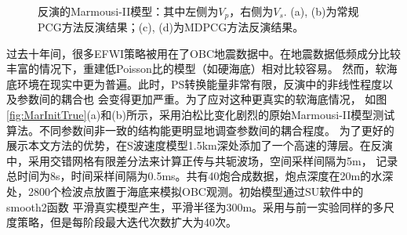 \begin{figure}[!htb]
    \begin{center}
		\\
        \caption{
			反演的Marmousi-II模型：其中左侧为$V_p$，右侧为$V_s$. (a), (b)为常规PCG方法反演结果；(c), (d)为MDPCG方法反演结果。
    }
    \label{fig:MarInvert}
    \end{center}
\end{figure}
过去十年间，很多EFWI策略被用在了OBC地震数据中。在地震数据低频成分比较丰富的情况下，重建低Poisson比的模型（如硬海底）相对比较容易\cite[]{bae:2012}。
然而，软海底环境在现实中更为普遍。此时，PS转换能量非常有限，反演中的非线性程度以及参数间的耦合也
会变得更加严重。为了应对这种更真实的软海底情况，
如图\ref{fig:MarInitTrue}(a)和(b)所示，采用泊松比变化剧烈的原始Marmousi-II模型测试算法。不同参数间非一致的结构能更明显地调查参数间的耦合程度。
为了更好的展示本文方法的优势，在S波速度模型1.5km深处添加了一个高速的薄层。在反演中，采用交错网格有限差分法来计算正传与共轭波场，空间采样间隔为5m，
记录总时间为8s，时间采样间隔为0.5ms。共有40炮合成数据，炮点深度在20m的水深处，2800个检波点放置于海底来模拟OBC观测。初始模型通过SU软件中的smooth2函数
平滑真实模型产生，平滑半径为300m。采用与前一实验同样的多尺度策略，但是每阶段最大迭代次数扩大为40次。

